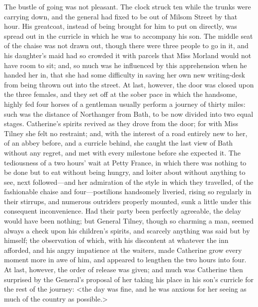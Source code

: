  The bustle of going was not pleasant. The clock struck ten while the trunks were carrying down, and the general had fixed to be out of Milsom Street by that hour. His greatcoat, instead of being brought for him to put on directly, was spread out in the curricle in which he was to accompany his son. The middle seat of the chaise was not drawn out, though there were three people to go in it, and his daughter's maid had so crowded it with parcels that Miss Morland would not have room to sit; and, so much was he influenced by this apprehension when he handed her in, that she had some difficulty in saving her own new writing-desk from being thrown out into the street. At last, however, the door was closed upon the three females, and they set off at the sober pace in which the handsome, highly fed four horses of a gentleman usually perform a journey of thirty miles: such was the distance of Northanger from Bath, to be now divided into two equal stages. Catherine's spirits revived as they drove from the door; for with Miss Tilney she felt no restraint; and, with the interest of a road entirely new to her, of an abbey before, and a curricle behind, she caught the last view of Bath without any regret, and met with every milestone before she expected it. The tediousness of a two hours' wait at Petty France, in which there was nothing to be done but to eat without being hungry, and loiter about without anything to see, next followed—and her admiration of the style in which they travelled, of the fashionable chaise and four—postilions handsomely liveried, rising so regularly in their stirrups, and numerous outriders properly mounted, sunk a little under this consequent inconvenience. Had their party been perfectly agreeable, the delay would have been nothing; but General Tilney, though so charming a man, seemed always a check upon his children's spirits, and scarcely anything was said but by himself; the observation of which, with his discontent at whatever the inn afforded, and his angry impatience at the waiters, made Catherine grow every moment more in awe of him, and appeared to lengthen the two hours into four. At last, however, the order of release was given; and much was Catherine then surprised by the General's proposal of her taking his place in his son's curricle for the rest of the journey: <the day was fine, and he was anxious for her seeing as much of the country as possible.> 

